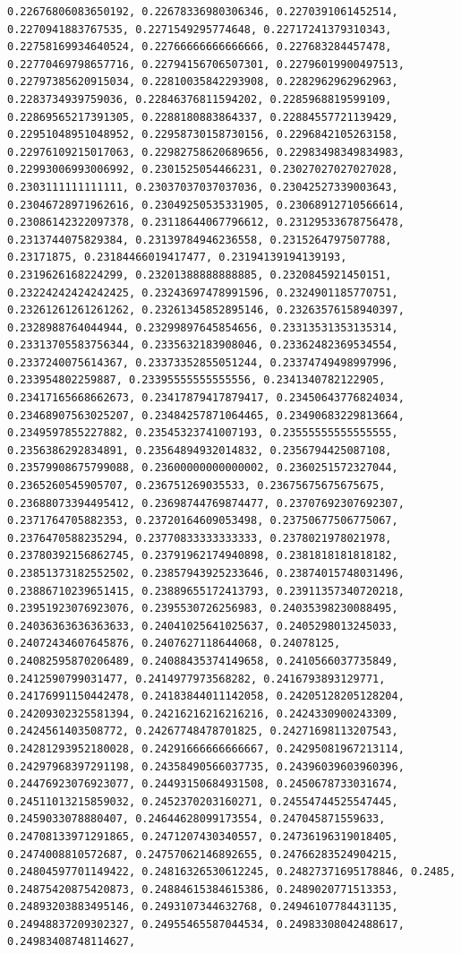 \documentclass[11pt]{article}
\begin{document}
\begin{Verbatim}[commandchars=\\\{\}]
0.22676806083650192, 0.22678336980306346, 0.2270391061452514, 0.2270941883767535, 0.2271549295774648, 0.22717241379310343, 0.22758169934640524, 0.22766666666666666, 0.227683284457478, 0.22770469798657716, 0.22794156706507301, 0.22796019900497513, 0.22797385620915034, 0.22810035842293908, 0.2282962962962963, 0.2283734939759036, 0.22846376811594202, 0.2285968819599109, 0.22869565217391305, 0.2288180883864337, 0.22884557721139429, 0.22951048951048952, 0.22958730158730156, 0.2296842105263158, 0.22976109215017063, 0.22982758620689656, 0.22983498349834983, 0.22993006993006992, 0.2301525054466231, 0.23027027027027028, 0.2303111111111111, 0.23037037037037036, 0.23042527339003643, 0.23046728971962616, 0.23049250535331905, 0.23068912710566614, 0.23086142322097378, 0.23118644067796612, 0.23129533678756478, 0.2313744075829384, 0.23139784946236558, 0.2315264797507788, 0.23171875, 0.23184466019417477, 0.23194139194139193, 0.2319626168224299, 0.23201388888888885, 0.2320845921450151, 0.23224242424242425, 0.23243697478991596, 0.2324901185770751, 0.23261261261261262, 0.23261345852895146, 0.23263576158940397, 0.2328988764044944, 0.23299897645854656, 0.23313531353135314, 0.23313705583756344, 0.2335632183908046, 0.23362482369534554, 0.2337240075614367, 0.23373352855051244, 0.23374749498997996, 0.233954802259887, 0.23395555555555556, 0.2341340782122905, 0.23417165668662673, 0.23417879417879417, 0.23450643776824034, 0.23468907563025207, 0.23484257871064465, 0.23490683229813664, 0.2349597855227882, 0.23545323741007193, 0.23555555555555555, 0.2356386292834891, 0.23564894932014832, 0.2356794425087108, 0.23579908675799088, 0.23600000000000002, 0.2360251572327044, 0.2365260545905707, 0.236751269035533, 0.23675675675675675, 0.23688073394495412, 0.23698744769874477, 0.23707692307692307, 0.2371764705882353, 0.23720164609053498, 0.23750677506775067, 0.2376470588235294, 0.23770833333333333, 0.2378021978021978, 0.23780392156862745, 0.23791962174940898, 0.2381818181818182, 0.23851373182552502, 0.23857943925233646, 0.23874015748031496, 0.23886710239651415, 0.23889655172413793, 0.23911357340720218, 0.23951923076923076, 0.2395530726256983, 0.24035398230088495, 0.24036363636363633, 0.24041025641025637, 0.2405298013245033, 0.24072434607645876, 0.2407627118644068, 0.24078125, 0.24082595870206489, 0.24088435374149658, 0.2410566037735849, 0.2412590799031477, 0.2414977973568282, 0.2416793893129771, 0.24176991150442478, 0.24183844011142058, 0.24205128205128204, 0.24209302325581394, 0.24216216216216216, 0.2424330900243309, 0.2424561403508772, 0.24267748478701825, 0.24271698113207543, 0.24281293952180028, 0.24291666666666667, 0.24295081967213114, 0.24297968397291198, 0.24358490566037735, 0.24396039603960396, 0.24476923076923077, 0.24493150684931508, 0.2450678733031674, 0.24511013215859032, 0.2452370203160271, 0.24554744525547445, 0.2459033078880407, 0.24644628099173554, 0.247045871559633, 0.24708133971291865, 0.2471207430340557, 0.24736196319018405, 0.2474008810572687, 0.24757062146892655, 0.24766283524904215, 0.24804597701149422, 0.24816326530612245, 0.24827371695178846, 0.2485, 0.24875420875420873, 0.24884615384615386, 0.2489020771513353, 0.24893203883495146, 0.2493107344632768, 0.24946107784431135, 0.24948837209302327, 0.24955465587044534, 0.24983308042488617, 0.24983408748114627, 
\end{Verbatim}
\end{document}
